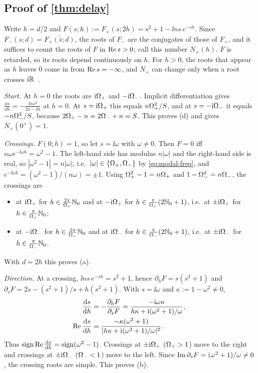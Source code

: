 \subsection{Proof of \cref{thm:delay}}\label{app:delay}
Write $h=d/2$ and $F(s;h):=F_+(s;2h)=s^2+1-\ii ns\,e^{-sh}$.
Since $F_-(s;d)=\overline{F_+(\bar s;d)}$, the roots of $F_-$ are the conjugates
of those of $F_+$, and it suffices to count the roots of $F$ in $\operatorname{Re} s>0$; call
this number $N_+(h)$.
$F$ is retarded, so its roots depend continuously on $h$.
For $h>0$, the roots that appear as $h$ leaves $0$ come in from
$\operatorname{Re} s=-\infty$, and $N_+$ can change only when a root crosses
$\mathrm{i}\mathbb{R}$~\citep{cooke1986zeroes,michiels2014stability}.

\emph{Start.} At $h=0$ the roots are $\mathrm{i}\Omega_+$ and $-\mathrm{i}\Omega_-$.
Implicit differentiation gives $\frac{\dd s}{\dd h}=-\frac{\ii ns^2}{2s-\ii n}$ at
$h=0$.
At $s=\mathrm{i}\Omega_+$ this equals $n\Omega_+^2/S$, and at $s=-\mathrm{i}\Omega_-$ it equals $-n\Omega_-^2/S$,
because $2\Omega_+-n=2\Omega_-+n=S$.
This proves (d) and gives $N_+(0^+)=1$.

\emph{Crossings.} $F(0;h)=1$, so let $s=\ii\omega$ with $\omega\neq0$.
Then $F=0$ iff $n\omega e^{-\ii\omega h}=\omega^2-1$.
The left-hand side has modulus $n|\omega|$ and the right-hand side is real, so
$|\omega^2-1|=n|\omega|$, i.e.\ $|\omega|\in\{\Omega_+,\Omega_-\}$ by \eqref{eq:modal-freq},
and $e^{-\ii\omega h}=(\omega^2-1)/(n\omega)=\pm1$.
Using $\Omega_+^2-1=n\Omega_+$ and $1-\Omega_-^2=n\Omega_-$, the crossings are
\begin{itemize}
\item at $\mathrm{i}\Omega_+$ for $h\in\frac{2\pi}{\Omega_+}\mathbb{N}_0$ and at $-\mathrm{i}\Omega_+$ for
  $h\in\frac{\pi}{\Omega_+}(2\mathbb{N}_0+1)$, i.e.\ at $\pm\mathrm{i}\Omega_+$ for $h\in\frac{\pi}{\Omega_+}\mathbb{N}_0$;
\item at $-\mathrm{i}\Omega_-$ for $h\in\frac{2\pi}{\Omega_-}\mathbb{N}_0$ and at $\mathrm{i}\Omega_-$ for
  $h\in\frac{\pi}{\Omega_-}(2\mathbb{N}_0+1)$, i.e.\ at $\pm\mathrm{i}\Omega_-$ for $h\in\frac{\pi}{\Omega_-}\mathbb{N}_0$.
\end{itemize}
With $d=2h$ this proves (a).

\emph{Direction.} At a crossing, $\ii ns\,e^{-sh}=s^2+1$, hence
$\partial_hF=s(s^2+1)$ and $\partial_sF=2s-(s^2+1)/s+h(s^2+1)$.
With $s=\ii\omega$ and $\kappa:=1-\omega^2\neq0$,
\begin{align*}
  \frac{\mathrm{d} s}{\mathrm{d} h}&=-\frac{\partial_hF}{\partial_sF}
  =\frac{-\mathrm{i}\omega\kappa}{h\kappa+\mathrm{i}(\omega^2+1)/\omega},\\
  \operatorname{Re}\frac{\mathrm{d} s}{\mathrm{d} h}&=\frac{-\kappa(\omega^2+1)}{|h\kappa+\mathrm{i}(\omega^2+1)/\omega|^2}.
\end{align*}
Thus $\operatorname{sign}\operatorname{Re}\frac{\mathrm{d} s}{\mathrm{d} h}=\operatorname{sign}(\omega^2-1)$.
Crossings at $\pm\mathrm{i}\Omega_+$ ($\Omega_+>1$) move to the right and crossings at
$\pm\mathrm{i}\Omega_-$ ($\Omega_-<1$) move to the left.
Since $\operatorname{Im}\partial_sF=(\omega^2+1)/\omega\neq0$, the crossing roots are
simple.
This proves (b).

